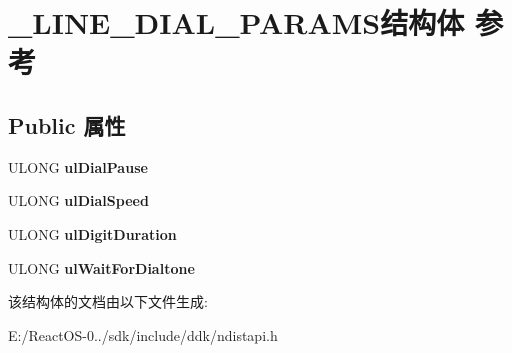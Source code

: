 \hypertarget{struct___l_i_n_e___d_i_a_l___p_a_r_a_m_s}{}\section{\+\_\+\+L\+I\+N\+E\+\_\+\+D\+I\+A\+L\+\_\+\+P\+A\+R\+A\+M\+S结构体 参考}
\label{struct___l_i_n_e___d_i_a_l___p_a_r_a_m_s}
\subsection*{Public 属性}
\begin{DoxyCompactItemize}
\item 
\mbox{\label{struct___l_i_n_e___d_i_a_l___p_a_r_a_m_s_aabb28dcfc448aa38a2b28d6af76f386b}} 
U\+L\+O\+NG {\bfseries ul\+Dial\+Pause}
\item 
\mbox{\label{struct___l_i_n_e___d_i_a_l___p_a_r_a_m_s_ad3da72e8c30bd0ca54b80ecb8323b43b}} 
U\+L\+O\+NG {\bfseries ul\+Dial\+Speed}
\item 
\mbox{\label{struct___l_i_n_e___d_i_a_l___p_a_r_a_m_s_af0c9a6c4331683cf12de414aa013652d}} 
U\+L\+O\+NG {\bfseries ul\+Digit\+Duration}
\item 
\mbox{\label{struct___l_i_n_e___d_i_a_l___p_a_r_a_m_s_ae18ded821d50eda0f5179f90010b3900}} 
U\+L\+O\+NG {\bfseries ul\+Wait\+For\+Dialtone}
\end{DoxyCompactItemize}


该结构体的文档由以下文件生成\+:\begin{DoxyCompactItemize}
\item 
E\+:/\+React\+O\+S-\/0../sdk/include/ddk/ndistapi.\+h\end{DoxyCompactItemize}
